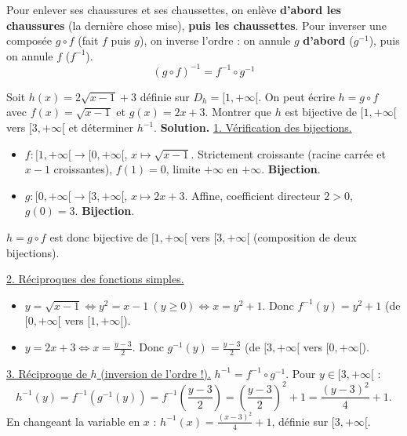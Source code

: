 \documentclass[11pt]{article}
\begin{document}
\begin{aretenir}
Pour enlever ses chaussures et ses chaussettes, on enlève \textbf{d'abord les chaussures} (la dernière chose mise), \textbf{puis les chaussettes}.
Pour inverser une composée $g \circ f$ (fait $f$ puis $g$), on inverse l'ordre : on annule $g$ \textbf{d'abord} ($g^{-1}$), puis on annule $f$ ($f^{-1}$).
\[
(g \circ f)^{-1} = f^{-1} \circ g^{-1}
\]
\end{aretenir}

\begin{exoresolu}
Soit $h(x) = 2\sqrt{x-1} + 3$ définie sur $D_h = [1, +\infty[$.
On peut écrire $h = g \circ f$ avec $f(x) = \sqrt{x-1}$ et $g(x) = 2x + 3$.
Montrer que $h$ est bijective de $[1, +\infty[$ vers $[3, +\infty[$ et déterminer $h^{-1}$.
\tcblower
\textbf{Solution.}
\underline{1. Vérification des bijections.}
\begin{itemize}
    \item $f : [1, +\infty[ \to [0, +\infty[$, $x \mapsto \sqrt{x-1}$.
    Strictement croissante (racine carrée et $x-1$ croissantes), $f(1)=0$, limite $+\infty$ en $+\infty$. \textbf{Bijection}.
    \item $g : [0, +\infty[ \to [3, +\infty[$, $x \mapsto 2x+3$.
    Affine, coefficient directeur $2>0$, $g(0)=3$. \textbf{Bijection}.
\end{itemize}
$h = g \circ f$ est donc bijective de $[1, +\infty[$ vers $[3, +\infty[$ (composition de deux bijections).

\underline{2. Réciproques des fonctions simples.}
\begin{itemize}
    \item $y = \sqrt{x-1} \iff y^2 = x-1 \ (y \ge 0) \iff x = y^2+1$. Donc $f^{-1}(y) = y^2+1$ (de $[0, +\infty[$ vers $[1, +\infty[$).
    \item $y = 2x+3 \iff x = \frac{y-3}{2}$. Donc $g^{-1}(y) = \frac{y-3}{2}$ (de $[3, +\infty[$ vers $[0, +\infty[$).
\end{itemize}

\underline{3. Réciproque de $h$ (inversion de l'ordre !).}
$h^{-1} = f^{-1} \circ g^{-1}$.
Pour $y \in [3, +\infty[$ :
\[
h^{-1}(y) = f^{-1}(g^{-1}(y)) = f^{-1}\left(\frac{y-3}{2}\right) = \left(\frac{y-3}{2}\right)^2 + 1 = \frac{(y-3)^2}{4} + 1.
\]
En changeant la variable en $x$ : $\boxed{h^{-1}(x) = \frac{(x-3)^2}{4} + 1}$, définie sur $[3, +\infty[$.
\end{exoresolu}
\end{document}
